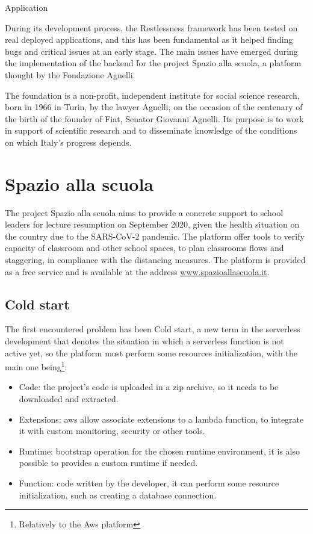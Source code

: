 \begin{chapter}{Application}
    \label{chap:application}

    During its development process, the Restlessness framework has been tested on
    real deployed applications, and this has been fundamental as it helped finding
    bugs and critical issues at an early stage.
    The main issues have emerged during the implementation of the backend for the
    project Spazio alla scuola, a platform thought by the Fondazione Agnelli.

    The foundation is a non-profit, independent institute for social science research,
    born in 1966 in Turin, by the lawyer Agnelli, on the occasion of the centenary
    of the birth of the founder of Fiat, Senator Giovanni Agnelli.
    Its purpose is to work in support of scientific research and to disseminate
    knowledge of the conditions on which Italy's progress depends.

    \section{Spazio alla scuola}
    The project Spazio alla scuola aims to provide a concrete support to school
    leaders for lecture resumption on September 2020, given the health situation on the
    country due to the SARS-CoV-2 pandemic.
    The platform offer tools to verify capacity of classroom and other school spaces,
    to plan classrooms flows and staggering, in compliance with the distancing measures.
    The platform is provided as a free service and is available at the address
    \url{www.spazioallascuola.it}.

    \subsection{Cold start}
    \label{subsec:cold_start}

    The first encountered problem has been Cold start, a new term in the serverless
    development that denotes the situation in which a serverless function is not
    active yet, so the platform must perform some resources initialization, with the
    main one being\footnote{Relatively to the Aws platform}:

    \begin{itemize}
        \item Code: the project's code is uploaded in a zip archive, so it needs to
            be downloaded and extracted.
        \item Extensions: aws allow associate extensions to a lambda function, to
            integrate it with custom monitoring, security or other tools.
        \item Runtime: bootstrap operation for the chosen runtime environment,
            it is also possible to provides a custom runtime if needed.
        \item Function: code written by the developer, it can perform some resource
            initialization, such as creating a database connection.
    \end{itemize}


\end{chapter}
